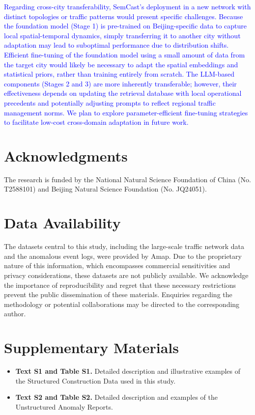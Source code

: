 \documentclass{article}
\begin{document}
\textcolor{blue}{Regarding cross-city transferability, SemCast's deployment in a new network with distinct topologies or traffic patterns would present specific challenges. Because the foundation model (Stage 1) is pre-trained on Beijing-specific data to capture local spatial-temporal dynamics, simply transferring it to another city without adaptation may lead to suboptimal performance due to distribution shifts. Efficient fine-tuning of the foundation model using a small amount of data from the target city would likely be necessary to adapt the spatial embeddings and statistical priors, rather than training entirely from scratch. The LLM-based components (Stages 2 and 3) are more inherently transferable; however, their effectiveness depends on updating the retrieval database with local operational precedents and potentially adjusting prompts to reflect regional traffic management norms. We plan to explore parameter-efficient fine-tuning strategies to facilitate low-cost cross-domain adaptation in future work.}

\section*{Acknowledgments}

The research is funded by the National Natural Science Foundation of China (No. T2588101) and Beijing Natural Science Foundation (No. JQ24051).

\section{Data Availability}

The datasets central to this study, including the large-scale traffic network data and the anomalous event logs, were provided by Amap. Due to the proprietary nature of this information, which encompasses commercial sensitivities and privacy considerations, these datasets are not publicly available. We acknowledge the importance of reproducibility and regret that these necessary restrictions prevent the public dissemination of these materials. Enquiries regarding the methodology or potential collaborations may be directed to the corresponding author.

\section{Supplementary Materials}
\begin{itemize}
    \item \textbf{Text S1 and Table S1.} Detailed description and illustrative examples of the Structured Construction Data used in this study.

    \item \textbf{Text S2 and Table S2.} Detailed description and examples of the Unstructured Anomaly Reports.
\end{itemize}

\printbibliography
\end{document}
